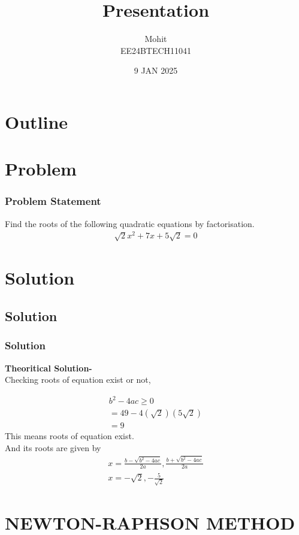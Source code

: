 \documentclass{beamer}
\title{Presentation}
\author{Mohit \\ EE24BTECH11041}
\date{9 JAN 2025}
\providecommand{\brak}[1]{\ensuremath{\left(#1\right)}}
\theoremstyle{remark}
\numberwithin{equation}{section}
\begin{document}
\begin{frame}
\titlepage
\end{frame}

\section*{Outline}
\begin{frame}
\tableofcontents
\end{frame}
\section{Problem}
\begin{frame}
\frametitle{Problem Statement}
%
Find the roots of the following quadratic equations by factorisation.
\begin{align}
\sqrt{2}x^2 + 7x + 5\sqrt{2} = 0
\end{align}

\end{frame}

\section{Solution}
\subsection{Solution}
\begin{frame}
\frametitle{Solution}


\textbf{Theoritical Solution-}\\
Checking roots of equation exist or not,

\begin{align}
b^2 - 4ac \geq 0 \\
= 49 - 4(\sqrt{2})\brak{5\sqrt{2}}\\
= 9 
\end{align}
This means roots of equation exist.\\
And its roots are given by 
\begin{align}
x = \frac{b-\sqrt{b^2-4ac}}{2a},\frac{b+\sqrt{b^2-4ac}}{2a}\\
x = -\sqrt{2},-\frac{5}{\sqrt{2}}
\end{align}
    \end{frame}
    


\section{NEWTON-RAPHSON METHOD}
\end{document}

